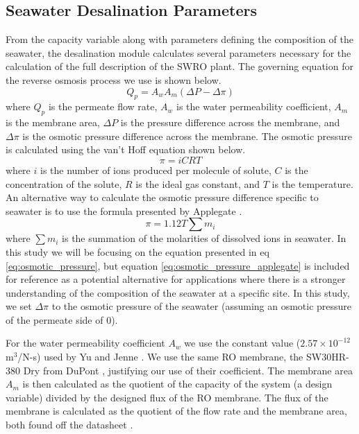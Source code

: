 \documentclass[twocolumn,10pt]{asme2e}
\begin{document}
\subsection{Seawater Desalination Parameters}
From the capacity variable along with parameters defining the composition of the seawater, the desalination module calculates several parameters necessary for the calculation of the full description of the SWRO plant. The governing equation for the reverse osmosis process we use is shown below.
\begin{equation}
    \label{eq:ro}
    Q_p = A_w A_m (\Delta P - \Delta \pi)
\end{equation}
where $Q_p$ is the permeate flow rate, $A_w$ is the water permeability coefficient, $A_m$ is the membrane area, $\Delta P$ is the pressure difference across the membrane, and $\Delta \pi$ is the osmotic pressure difference across the membrane. The osmotic pressure is calculated using the van't Hoff equation shown below.
\begin{equation}
    \label{eq:osmotic_pressure}
    \pi = iCRT
\end{equation}
where $i$ is the number of ions produced per molecule of solute, $C$ is the concentration of the solute, $R$ is the ideal gas constant, and $T$ is the temperature. An alternative way to calculate the osmotic pressure difference specific to seawater is to use the formula presented by Applegate \cite{separationprocesses}.
\begin{equation}
    \label{eq:osmotic_pressure_applegate}
    \pi = 1.12 T \sum m_i
\end{equation}
where $\sum m_i$ is the summation of the molarities of dissolved ions in seawater. In this study we will be focusing on the equation presented in eq \ref{eq:osmotic_pressure}, but equation \ref{eq:osmotic_pressure_applegate} is included for reference as a potential alternative for applications where there is a stronger understanding of the composition of the seawater at a specific site. In this study, we set $\Delta \pi$ to the osmotic pressure of the seawater (assuming an osmotic pressure of the permeate side of 0).

For the water permeability coefficient $A_w$ we use the constant value ($2.57\times10^{-12}$ m$^3$/N-s) used by Yu and Jenne \cite{Yu2018}. We use the same RO membrane, the SW30HR-380 Dry from DuPont \cite{SW30HR380}, justifying our use of their coefficient. The membrane area $A_m$ is then calculated as the quotient of the capacity of the system (a design variable) divided by the designed flux of the RO membrane. The flux of the membrane is calculated as the quotient of the flow rate and the membrane area, both found off the datasheet \cite{SW30HR380}.
\end{document}
